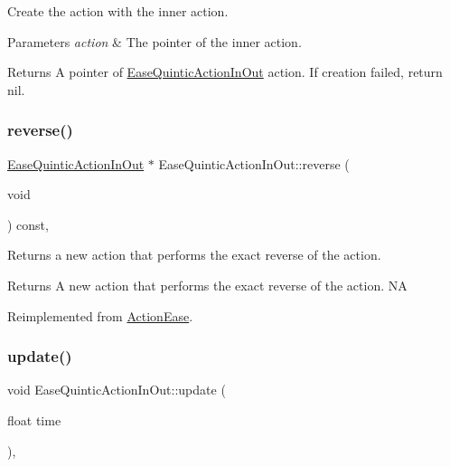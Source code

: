 Create the action with the inner action. 


\begin{DoxyParams}{Parameters}
{\em action} & The pointer of the inner action. \\
\hline
\end{DoxyParams}
\begin{DoxyReturn}{Returns}
A pointer of \hyperlink{classEaseQuinticActionInOut}{Ease\+Quintic\+Action\+In\+Out} action. If creation failed, return nil. 
\end{DoxyReturn}
\mbox{\label{classEaseQuinticActionInOut_a42cff7cafb10562b6e111274879f76bd}} 
\subsubsection{\texorpdfstring{reverse()}{reverse()}}
{\footnotesize\ttfamily \hyperlink{classEaseQuinticActionInOut}{Ease\+Quintic\+Action\+In\+Out} $\ast$ Ease\+Quintic\+Action\+In\+Out\+::reverse (\begin{DoxyParamCaption}\item[{void}]{ }\end{DoxyParamCaption}) const\hspace{0.3cm}{\ttfamily [override]}, {\ttfamily [virtual]}}

Returns a new action that performs the exact reverse of the action.

\begin{DoxyReturn}{Returns}
A new action that performs the exact reverse of the action.  NA 
\end{DoxyReturn}


Reimplemented from \hyperlink{classActionEase_ab99eb083fa033fae1d6c948fdc730782}{Action\+Ease}.

\mbox{\label{classEaseQuinticActionInOut_ada59f8dcd6ba1daeaa1fb9d5b1087521}} 
\subsubsection{\texorpdfstring{update()}{update()}}
{\footnotesize\ttfamily void Ease\+Quintic\+Action\+In\+Out\+::update (\begin{DoxyParamCaption}\item[{float}]{time }\end{DoxyParamCaption})\hspace{0.3cm}{\ttfamily [override]}, {\ttfamily [virtual]}}


